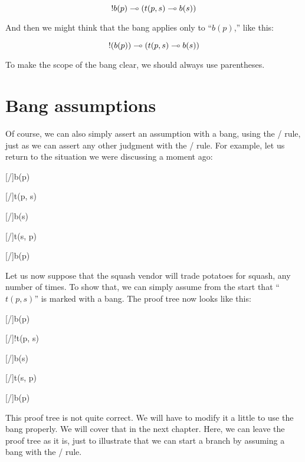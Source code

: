 \documentclass[../../../main.tex]{subfiles}
\begin{document}
\begin{equation*}
  !b(p) \lolli/ (t(p, s) \lolli/ b(s))
\end{equation*}

\noindent
And then we might think that the bang applies only to ``$b(p)$,'' like this:

\begin{equation*}
  !(b(p)) \lolli/ (t(p, s) \lolli/ b(s))
\end{equation*}

\noindent
To make the scope of the bang clear, we should always use parentheses.


\section{Bang assumptions}

Of course, we can also simply assert an assumption with a bang, using the \startrule/ rule, just as we can assert any other judgment with the \startrule/ rule. For example, let us return to the situation we were discussing a moment ago:

\begin{prooftree*}
  \hypo{}
  [\startrule/]{b(p)}
  
  \hypo{}
  [\startrule/]{t(p, s)}
  
  [\traderule/]{b(s)}
  
  \hypo{}
  [\startrule/]{t(s, p)}
  
  [\traderule/]{b(p)}
\end{prooftree*}

\noindent
Let us now suppose that the squash vendor will trade potatoes for squash, any number of times. To show that, we can simply assume from the start that ``$t(p, s)$'' is marked with a bang. The proof tree now looks like this:

\begin{prooftree*}
  \hypo{}
  [\startrule/]{b(p)}
  
  \hypo{}
  [\startrule/]{!t(p, s)}
  
  [\traderule/]{b(s)}
  
  \hypo{}
  [\startrule/]{t(s, p)}
  
  [\traderule/]{b(p)}
\end{prooftree*}

\noindent
This proof tree is not quite correct. We will have to modify it a little to use the bang properly. We will cover that in the next chapter. Here, we can leave the proof tree as it is, just to illustrate that we can start a branch by assuming a bang with the \startrule/ rule.
\end{document}
